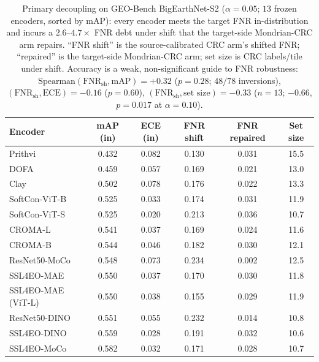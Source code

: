 \documentclass[journal]{IEEEtran}
\renewcommand{\_}{\textunderscore\allowbreak}
\begin{document}
\begin{table}[htbp]\centering\small
\caption{Primary decoupling on GEO-Bench BigEarthNet-S2 ($\alpha{=}0.05$; $13$ frozen encoders,
sorted by mAP): every encoder meets the target FNR in-distribution and incurs a $2.6$--$4.7\times$ FNR
debt under shift that the target-side Mondrian-CRC arm repairs. ``FNR shift'' is the source-calibrated
CRC arm's shifted FNR; ``repaired'' is the target-side Mondrian-CRC arm; set size is CRC labels/tile under
shift. Accuracy is a weak, non-significant guide to FNR robustness:
$\mathrm{Spearman}(\mathrm{FNR}_{\mathrm{sh}},\mathrm{mAP})=+0.32$ ($p{=}0.28$; $48/78$ inversions),
$(\mathrm{FNR}_{\mathrm{sh}},\mathrm{ECE})=-0.16$ ($p{=}0.60$),
$(\mathrm{FNR}_{\mathrm{sh}},\text{set size})=-0.33$ ($n{=}13$; $-0.66$, $p{=}0.017$ at
$\alpha{=}0.10$).}\label{tab:fnrdecouple}
\begin{tabular}{lccccc}
\toprule
Encoder & mAP (in) & ECE (in) & FNR shift & FNR repaired & Set size \\
\midrule
Prithvi              & 0.432 & 0.082 & 0.130 & 0.031 & 15.5 \\
DOFA                 & 0.459 & 0.057 & 0.169 & 0.021 & 13.0 \\
Clay                 & 0.502 & 0.078 & 0.176 & 0.022 & 13.3 \\
SoftCon-ViT-B        & 0.525 & 0.033 & 0.174 & 0.031 & 11.9 \\
SoftCon-ViT-S        & 0.525 & 0.020 & 0.213 & 0.036 & 10.7 \\
CROMA-L              & 0.541 & 0.037 & 0.169 & 0.024 & 11.6 \\
CROMA-B              & 0.544 & 0.046 & 0.182 & 0.030 & 12.1 \\
ResNet50-MoCo        & 0.548 & 0.073 & 0.234 & 0.002 & 12.5 \\
SSL4EO-MAE           & 0.550 & 0.037 & 0.170 & 0.030 & 11.8 \\
SSL4EO-MAE (ViT-L)   & 0.550 & 0.038 & 0.155 & 0.029 & 11.9 \\
ResNet50-DINO        & 0.551 & 0.055 & 0.232 & 0.014 & 10.8 \\
SSL4EO-DINO          & 0.559 & 0.028 & 0.191 & 0.032 & 10.6 \\
SSL4EO-MoCo          & 0.582 & 0.032 & 0.171 & 0.028 & 10.7 \\
\bottomrule
\end{tabular}
\end{table}
\end{document}
